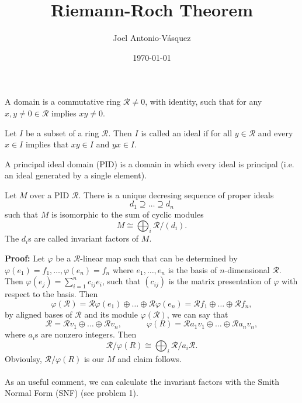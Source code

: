\documentclass[11pt]{scrartcl}
\newcommand{\CR}{\mathcal R}
\begin{document}
\title{Riemann-Roch Theorem}
\author{Joel Antonio-V\'asquez}
\date{\today}
\maketitle

\begin{definition*}
  A domain is a commutative ring $\CR \neq 0$, with identity, such that for any $x, y \neq 0 \in \CR$ implies $xy \neq 0$.
\end{definition*}

\begin{definition*}
  Let $I$ be a subset of a ring $\CR$. Then $I$ is called an ideal if for all $y \in \CR$ and every $x \in I$ implies that $xy \in I$ and $yx \in I$.
\end{definition*}

\begin{definition*}
  A principal ideal domain (PID) is a domain in which every ideal is principal (i.e. an ideal generated by a single element).
\end{definition*}

\begin{theorem}
  \label{theo:1}
  Let $M$ over a PID $\CR$. There is a unique decresing sequence of proper ideals
  $$
  d_{1} \supseteq \dots \supseteq d_{n}
  $$
  such that $M$ is isomorphic to the sum of cyclic modules
  $$
  M \cong \bigoplus_{i} \CR/(d_{i}).
  $$
  The $d_{i}$s are called invariant factors of $M$.
\end{theorem}
\textbf{Proof: }Let $\varphi$ be a $\CR$-linear map such that can be determined by $\varphi(e_{1}) = f_{1}, \dots, \varphi(e_{n}) = f_{n}$
where $e_{1}, \dots, e_{n}$ is the basis of $n$-dimensional $\CR$. Then $\varphi(e_{j}) = \sum_{i=1}^{n} c_{ij}e_{i}$, such that $(c_{ij})$ is the
matrix presentation of $\varphi$ with respect to the basis. Then
$$
\varphi(\CR) = \CR\varphi(e_{1}) \oplus \dots \oplus \CR\varphi(e_{n}) = \CR f_{1} \oplus \dots \oplus \CR f_{n},
$$
by aligned bases of $\CR$ and its module $\varphi(\CR)$, we can say that
$$
\CR = \CR v_{1} \oplus \dots \oplus \CR v_{n}, \hspace{3em} \varphi(R) = \CR a_{1}v_{1} \oplus \dots \oplus \CR a_{n}v_{n},
$$
where $a_{i}$s are nonzero integers. Then
$$
\CR/\varphi(R) \cong \bigoplus_{i} \CR/a_{i}\CR.
$$
Obvioulsy, $\CR/\varphi(R)$ is our $M$ and claim follows. \qedsymbol \\ \\
As an useful comment, we can calculate the invariant factors with the Smith
Normal Form (SNF) (see problem 1).
\end{document}
